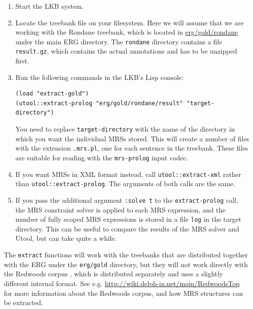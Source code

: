 \begin{enumerate}
\item Start the LKB system.
\item Locate the treebank file on your filesystem. Here we will assume
that we are working with the Rondane treebank, which is located in
\url{erg/gold/rondane} under the main ERG directory. The \verb|rondane| directory contains a file \verb|result.gz|, which contains the actual annotations and has to be unzipped first.
\item Run the following commands in the LKB's Lisp console:
\begin{verbatim}
(load "extract-gold")
(utool::extract-prolog "erg/gold/rondane/result" "target-directory")
\end{verbatim}
You need to replace \verb?target-directory? with the name of the
directory in which you want the individual MRSs stored. This will
create a number of files with the extension \verb?.mrs.pl?, one for
each sentence in the treebank. These files are suitable for reading
with the \verb?mrs-prolog? input codec.
\item If you want MRSs in XML format instead, call
\verb?utool::extract-xml? rather than
\verb?utool::extract-prolog?. The arguments of both calls are the
same. 
\item If you pass the additional argument \verb?:solve t? to the
\verb?extract-prolog? call, the MRS constraint solver is applied to
each MRS expression, and the number of fully scoped MRS expressions is
stored in a file \verb|log| in the target directory. This can be
useful to compare the results of the MRS solver and Utool, but can
take quite a while.
\end{enumerate}

The \verb?extract? functions will work with the treebanks that are
distributed together with the ERG under the \verb|erg/gold| directory,
but they will not work directly with the Redwoods corpus
\cite{Oepen&al:Redwoods}, which is distributed separately and uses a
slightly different internal format. See e.g.
\url{http://wiki.delph-in.net/moin/RedwoodsTop} for more information
about the Redwoods corpus, and how MRS structures can be extracted.




